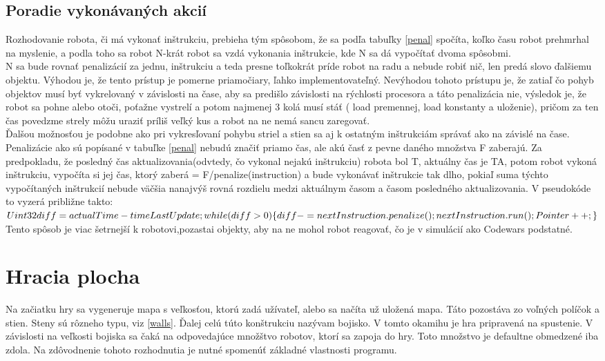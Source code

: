 \subsection{Poradie vykonávaných akcií}

Rozhodovanie robota, či má vykonať inštrukciu, prebieha tým spôsobom, že sa podľa tabuľky \ref{penal} spočíta, koľko času robot prehmrhal na myslenie, a podla toho sa robot N-krát robot sa vzdá vykonania inštrukcie, kde N sa dá vypočítať dvoma spôsobmi.\\
N sa bude rovnať penalizácií za jednu, inštrukciu a teda presne toľkokrát príde robot na radu a nebude robiť nič, len predá slovo ďalšiemu objektu. Výhodou je, že tento prístup je pomerne priamočiary, ľahko implementovateľný. Nevýhodou tohoto prístupu je, že zatiaľ čo pohyb objektov musí byť vykrelovaný v závislosti na čase, aby sa predišlo závislosti na rýchlosti procesora a táto penalizácia nie, výsledok je, že robot sa pohne alebo otoči, poťažne vystrelí a potom najmenej 3 kolá musí stáť ( load premennej, load konstanty a uloženie), pričom za ten čas povedzme strely môžu uraziť príliš veľký kus a robot na ne nemá sancu zaregovať.\\
Ďalšou možnosťou je podobne ako pri vykresľovaní pohybu striel a stien sa aj k ostatným inštrukciám správať ako na závislé na čase. Penalizácie ako sú popísané v tabuľke \ref{penal} nebudú značiť priamo čas, ale akú časť z pevne daného množstva F zaberajú. Za predpokladu, že posledný čas aktualizovania(odvtedy, čo vykonal nejakú inštrukciu) robota bol T, aktuálny čas je TA, potom robot vykoná inštrukciu, vypočíta si jej čas, ktorý zaberá = F/penalize(instruction) a bude vykonávať inštrukcie tak dlho, pokiaľ suma týchto vypočítaných inštrukcií nebude väčšia nanajvýš rovná rozdielu medzi aktuálnym časom a časom posledného aktualizovania. V pseudokóde to vyzerá približne takto:\\
$ Uint32 diff= actualTime - timeLastUpdate;\\ while (diff > 0)\\\{\\ diff-=nextInstruction.penalize();\\nextInstruction.run();\\Pointer ++; \\\}\\ $ Tento spôsob je viac šetrnejší k robotovi,pozastai objekty, aby na ne mohol robot reagovať, čo je v simulácií ako Codewars podstatné.	

\section{Hracia plocha} %
Na začiatku hry sa vygeneruje mapa s veľkosťou, ktorú zadá užívateľ, alebo sa načíta už uložená mapa. Táto pozostáva zo voľných políčok a stien. Steny sú rôzneho typu, viz \ref{walls}. Ďalej celú túto konštrukciu nazývam bojisko. V tomto okamihu je hra pripravená na spustenie. V závislosti na veľkosti bojiska sa čaká na odpovedajúce množštvo robotov, ktorí sa zapoja do hry. Toto množstvo je defaultne obmedzené iba zdola. Na zdôvodnenie tohoto rozhodnutia je nutné spomenúť základné vlastnosti programu. 
